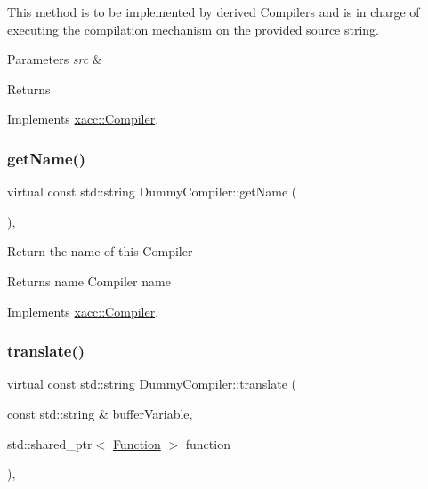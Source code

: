 This method is to be implemented by derived Compilers and is in charge of executing the compilation mechanism on the provided source string. 
\begin{DoxyParams}{Parameters}
{\em src} & \\
\hline
\end{DoxyParams}
\begin{DoxyReturn}{Returns}

\end{DoxyReturn}


Implements \hyperlink{a01451_a9092f5f779b570c91569b59621280c04}{xacc\+::\+Compiler}.

\mbox{\label{a01139_a76460cb78671dc2cf42f2bebf8fb80c7}} 
\subsubsection{\texorpdfstring{get\+Name()}{getName()}}
{\footnotesize\ttfamily virtual const std\+::string Dummy\+Compiler\+::get\+Name (\begin{DoxyParamCaption}{ }\end{DoxyParamCaption})\hspace{0.3cm}{\ttfamily [inline]}, {\ttfamily [virtual]}}

Return the name of this Compiler \begin{DoxyReturn}{Returns}
name Compiler name 
\end{DoxyReturn}


Implements \hyperlink{a01451_a87fca9100e6462122f5b687c3a0fb3fb}{xacc\+::\+Compiler}.

\mbox{\label{a01139_a606c27150c8d374242b8824e45b1e0c1}} 
\subsubsection{\texorpdfstring{translate()}{translate()}}
{\footnotesize\ttfamily virtual const std\+::string Dummy\+Compiler\+::translate (\begin{DoxyParamCaption}\item[{const std\+::string \&}]{buffer\+Variable,  }\item[{std\+::shared\+\_\+ptr$<$ \hyperlink{a01475}{Function} $>$}]{function }\end{DoxyParamCaption})\hspace{0.3cm}{\ttfamily [inline]}, {\ttfamily [virtual]}}

